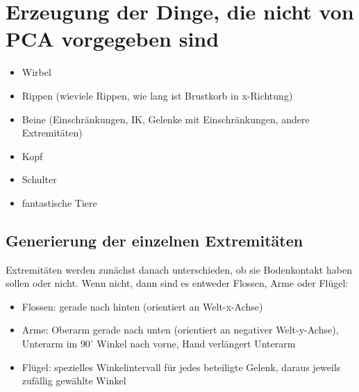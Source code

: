 \chapter{Erzeugung der Dinge, die nicht von PCA vorgegeben sind}

\begin{itemize}
 \item Wirbel
 \item Rippen (wieviele Rippen, wie lang ist Brustkorb in x-Richtung)
 \item Beine (Einschränkungen, IK, Gelenke mit Einschränkungen, andere Extremitäten)
 \item Kopf
 \item Schulter
 \item fantastische Tiere
\end{itemize}


\section{Generierung der einzelnen Extremitäten}
\label{section:extremity_generation}

Extremitäten werden zunächst danach unterschieden, ob sie Bodenkontakt haben sollen oder nicht.
Wenn nicht, dann sind es entweder Flossen, Arme oder Flügel:

\begin{itemize}
 \item Flossen: gerade nach hinten (orientiert an Welt-x-Achse)
 \item Arme: Oberarm gerade nach unten (orientiert an negativer Welt-y-Achse), Unterarm im $90^{\circ}$ Winkel nach vorne, Hand verlängert Unterarm 
 \item Flügel: spezielles Winkelintervall für jedes beteiligte Gelenk, daraus jeweils zufällig gewählte Winkel
\end{itemize}

